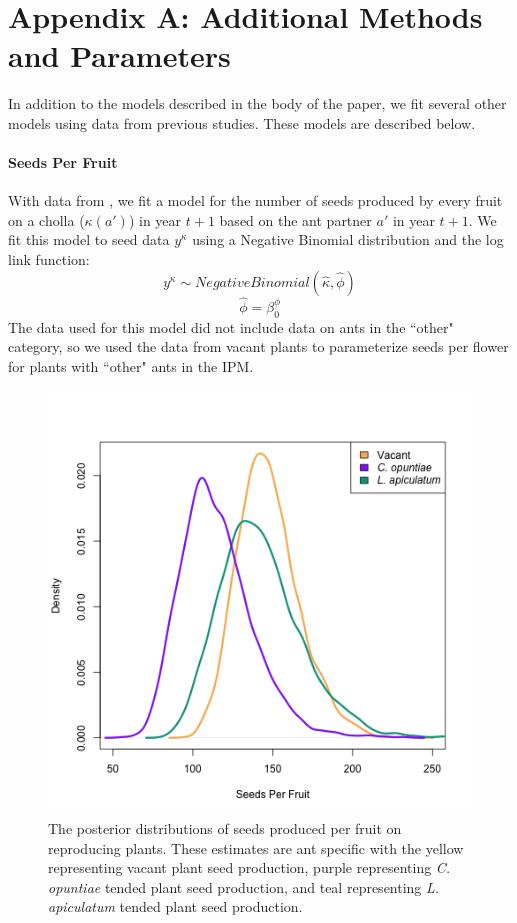 \documentclass[11pt]{article}
\begin{document}
\newpage{}


\appendix
\label{appendix}
\section*{Appendix A: Additional Methods and Parameters} \label{appendix:A}
\renewcommand{\thefigure}{A\arabic{figure}}

In addition to the models described in the body of the paper, we fit several other models using data from previous studies.
These models are described below.

\paragraph{Seeds Per Fruit}
With data from \cite{Ohm2014}, we fit a model for the number of seeds produced by every fruit on a cholla ($\kappa(a')$) in year $t+1$ based on the ant partner $a'$ in year $t+1$.
We fit this model to seed data $y^{\kappa}$ using a Negative Binomial distribution and the log link function: 
$$y^{\kappa} \sim  Negative Binomial(\hat{\kappa},\hat{\phi})$$
$$\hat{\phi} = \beta_{0}^{\phi}$$
The data used for this model did not include data on ants in the ``other" category, so we used the data from vacant plants to parameterize seeds per flower for plants with ``other" ants in the IPM.

\begin{figure}
	\includegraphics[width=0.91\linewidth]{Figures/Seeds_Per_Fruit.png}
	\caption{The posterior distributions of seeds produced per fruit on reproducing plants.
		These estimates are ant specific with the yellow representing vacant plant seed production, purple representing \textit{C. opuntiae} tended plant seed production, and teal representing \textit{L. apiculatum} tended plant seed production.
		 }
	\label{app:seeds}
\end{figure}
\end{document}
